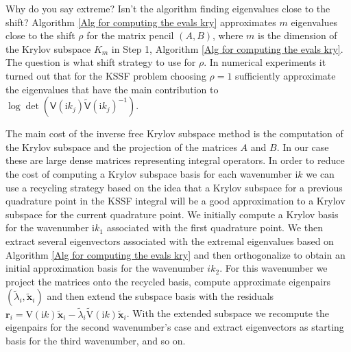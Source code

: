     
{\color{red} Why do you say extreme? Isn't the algorithm finding eigenvalues close to the shift?} {\color{teal} Algorithm \ref{Alg for computing the evals kry} approximates $m$ eigenvalues close to the shift $\rho$ 
for the matrix pencil $(A,B)$}, where $m$ is the dimension of the 
Krylov subspace $K_{m}$ in Step 1, Algorithm \ref{Alg for computing the evals kry}. The question is what shift strategy to use for $\rho$. In numerical experiments it turned
out that for the KSSF problem choosing $\rho=1$ sufficiently approximate the eigenvalues that have the main contribution to $\log\det(\mathsf{V}(\mathrm{i}k_{j})\tilde{\mathsf{V}}(\mathrm{i}k_{j})^{-1}) $.

The main cost of the inverse free Krylov subspace method is the computation of the Krylov subspace and the projection of the matrices $A$ and $B$. In our case these are large dense matrices representing
integral operators. In order to reduce the cost of computing a Krylov subspace basis for each wavenumber $\mathrm{i}k$ we can use a recycling strategy based on the idea that a Krylov subspace for a previous quadrature
point in the KSSF integral will be a good approximation to a Krylov subspace for the current quadrature point. We initially compute a Krylov basis for the wavenumber $\mathrm{i}k_{1}$ associated with the first
quadrature point. We then extract several eigenvectors associated with the extremal eigenvalues based on Algorithm \ref{Alg for computing the evals kry} and then orthogonalize to obtain an initial approximation
basis for the wavenumber $ik_2$. For this wavenumber we project the matrices onto the recycled basis, compute approximate eigenpairs $(\tilde{\lambda}_i, \tilde{\mathbf{x}}_i)$ and then extend the subspace
basis with the residuals $\boldsymbol{r}_i = \mathrm{V}(\mathrm{i}k)\tilde{\boldsymbol{x}}_i - \tilde{\lambda}_i\tilde{\mathrm{V}}(\mathrm{i}k)\tilde{\boldsymbol{x}}_i$. With the extended subspace we recompute the eigenpairs for the second wavenumber's
case and extract eigenvectors as starting basis for the third wavenumber, and so on.


